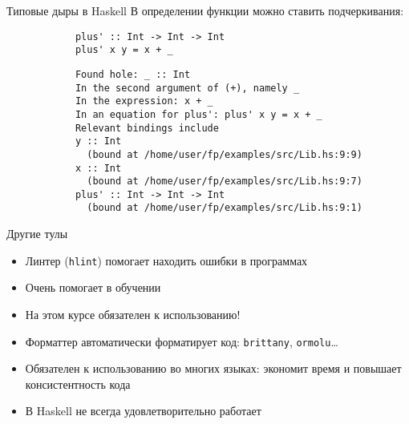     \begin{frame}[fragile]{Типовые дыры в Haskell}
        В определении функции можно ставить подчеркивания:
        \begin{verbatim}
            plus' :: Int -> Int -> Int
            plus' x y = x + _
        \end{verbatim}
        \vspace{1em}
        \begin{verbatim}
            Found hole: _ :: Int
            In the second argument of (+), namely _
            In the expression: x + _
            In an equation for plus': plus' x y = x + _
            Relevant bindings include
            y :: Int
              (bound at /home/user/fp/examples/src/Lib.hs:9:9)
            x :: Int
              (bound at /home/user/fp/examples/src/Lib.hs:9:7)
            plus' :: Int -> Int -> Int
              (bound at /home/user/fp/examples/src/Lib.hs:9:1)
        \end{verbatim}
    \end{frame}

    \begin{frame}[fragile]{Другие тулы}
        \begin{itemize}
            \item Линтер (\texttt{hlint}) помогает находить ошибки в программах
            \item Очень помогает в обучении
            \item[\NB] На этом курсе обязателен к использованию!
            \item Форматтер автоматически форматирует код: \texttt{brittany}, \texttt{ormolu}\ldots
            \item Обязателен к использованию во многих языках: экономит время и повышает консистентность кода
            \item В Haskell не всегда удовлетворительно работает
        \end{itemize}
    \end{frame}

